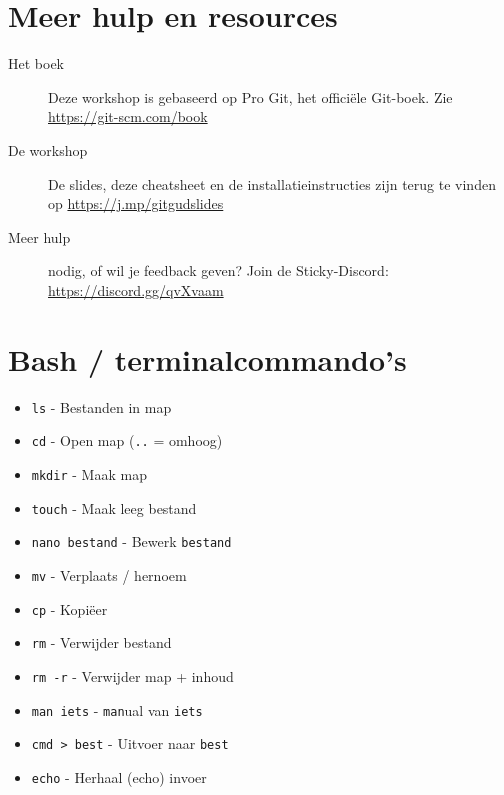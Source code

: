 \documentclass[9pt,a4paper]{extarticle}
\newcommand{\shell}[1]{\texttt{#1}}
\newcommand{\shell}[1]{\texttt{#1}}
\begin{document}
\section*{Meer hulp en resources}
\begin{description}
	\item [Het boek] Deze workshop is gebaseerd op Pro Git, het officiële Git-boek. Zie \url{https://git-scm.com/book}
	\item[De workshop] De slides, deze cheatsheet en de installatieinstructies zijn terug te vinden op
		\url{https://j.mp/gitgudslides}
	\item[Meer hulp] nodig, of wil je feedback geven? Join de Sticky-Discord: \url{https://discord.gg/qvXvaam}
\end{description}

{
	\section*{Bash / terminalcommando's}
	\begin{multicols}{3}
		\begin{itemize}
			\item \texttt{ls} - Bestanden in map
			\item \texttt{cd} - Open map (\shell{..} = omhoog)
			\item \texttt{mkdir} - Maak map
			\item \texttt{touch} - Maak leeg bestand
			\item \texttt{nano bestand} - Bewerk \shell{bestand}
			\item \texttt{mv} - Verplaats / hernoem
			\item \texttt{cp} - Kopi\"eer
			\item \texttt{rm} - Verwijder bestand
			\item \texttt{rm -r} - Verwijder map + inhoud
			\item \texttt{man iets} - \texttt{man}ual van \texttt{iets}
			\item \texttt{cmd > best} - Uitvoer naar \texttt{best}
			\item \texttt{echo} - Herhaal (echo) invoer
		\end{itemize}
	\end{multicols}
}
\end{document}

